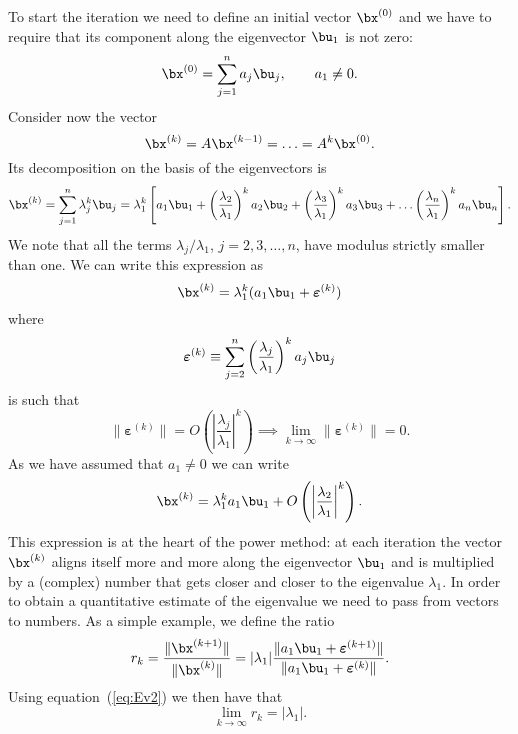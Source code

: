 To start the iteration we need to define an initial vector $\bx^{(0)}$
and we have to require that its component along the eigenvector
$\bu_1$ is not zero:
%
\begin{equation*}
 \bx^{(0)} = \sum_{j=1}^n a_j \bu_j , \qquad a_1 \neq 0 .
\end{equation*}
%
Consider now the vector
%
\begin{equation*}
 \bx^{(k)} = A \bx^{(k-1)} = \ldots = A^k \bx^{(0)}.
\end{equation*}
%
Its decomposition on the basis of the eigenvectors is
%
\begin{equation*}
 \bx^{(k)} = \sum_{j=1}^n \lambda_j^k \bu_j = 
             \lambda_1^k \left [ a_1 \bu_1 + 
             \left ( \frac{\lambda_2}{\lambda_1} \right )^k a_2 \bu_2 +
             \left ( \frac{\lambda_3}{\lambda_1} \right )^k a_3 \bu_3 +
             \ldots
             \left ( \frac{\lambda_n}{\lambda_1} \right )^k a_n \bu_n 
              \right ] .
\end{equation*} 
%
We note that all the terms $\lambda_j/\lambda_1$, $j=2,3,\ldots,n$,
have modulus strictly smaller than one.  We can write this expression
as
%
\begin{equation}
  \bx^{(k)} = \lambda_1^k ( a_1 \bu_1 + \boldsymbol{\varepsilon}^{(k)} )
  \label{eq:Ev3}
\end{equation}
%
where 
%
\begin{equation}
  \boldsymbol{\varepsilon}^{(k)} \equiv  \sum_{j=2}^n 
  \left ( \frac{\lambda_j}{\lambda_1} \right )^k a_j \bu_j
  \label{eq:Ev5}
\end{equation}
%
is such that
%
\begin{equation}
  \| \boldsymbol{\varepsilon}^{(k)} \| = 
  O \left ( \left | \frac{\lambda_j}{\lambda_1} \right |^k \right )
  \implies 
  \lim_{k \to \infty} \| \boldsymbol{\varepsilon}^{(k)} \| = 0.
  \label{eq:Ev2}
\end{equation}
%
As we have assumed that $a_1 \neq 0$ we can write
%
\begin{equation}
  \bx^{(k)} = \lambda_1^k a_1 \bu_1 + 
  O \left ( \left | \frac{\lambda_2}{\lambda_1} \right |^k \right ) .
  \label{eq:Ev6}
\end{equation}
%
This expression is at the heart of the power method: at each iteration
the vector $\bx^{(k)}$ aligns itself more and more along the
eigenvector $\bu_1$ and is multiplied by a (complex) number that gets
closer and closer to the eigenvalue $\lambda_1$.  In order to obtain a
quantitative estimate of the eigenvalue we need to pass from vectors
to numbers. As a simple example, we define the ratio
%
\begin{equation*}
 r_k = \frac{\| \bx^{(k+1)} \|}{\| \bx^{(k)} \|} = | \lambda_1 | 
        \frac{\| a_1 \bu_1 + \boldsymbol{\varepsilon}^{(k+1)} \|}
             {\| a_1 \bu_1 + \boldsymbol{\varepsilon}^{(k)} \|} .
\end{equation*}
%
Using equation~(\ref{eq:Ev2}) we then have that
%
\begin{equation*}
 \lim_{k \to \infty} r_k = | \lambda_1 | .
\end{equation*}

